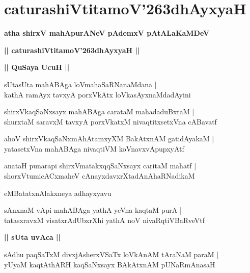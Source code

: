 \documentclass[twoside,12pt,openright]{book}
\def\S{\char'263}
\newcounter{shloka}[chapter]
\def\uvaca#1{\centerline{{\large\textbf{#1}}}}
\begin{document}
\chapter{caturashiVtitamoV\S dhAyxyaH}

\begin{center}
{\LARGE\bfseries atha shirxV mahApurANeV pAdemxV pAtALaKaMDeV }
\end{center}

\begin{center}         
{\LARGE\bfseries || caturashiVtitamoV\S dhAyxyaH ||}
\end{center}

\uvaca{|| QuSaya UcuH ||}

\begin{shloka}%
sUtasUta mahABAga loVmahaSaRNanaMdana |\\
kathA ramAyx tavxyA porxVkAtx loVkasAyxnaMdadAyini
\end{shloka}

\begin{shloka}%
shirxVkaqSaNxsayx mahABAga carataM mahadaduBxtaM |\\
shurxtaM saravxM tavxyA porxVkatxM nivaqtitxsetxVna cABavatf 
\end{shloka}

\begin{shloka}%
ahoV shirxVkaqSaNxmAhAtamxyXM BakAtxnAM gatidAyakaM |\\
yatasetxVna mahABAga nivaqtiVM koVnavxvApupxyAtf 
\end{shloka}

\begin{shloka}%
anataH punarapi shirxVmatakxqqSaNxsayx caritaM mahatf |\\
shorxVtumicACxmaheV cAnayxdavxrXtadAnAhaRNadikaM 
\end{shloka}

\begin{center}
eMBatatxnAlakxneya adhayxyavu
\end{center}

\begin{shloka}%
sAnxnaM vApi mahABAga yathA yeVna kaqtaM purA |\\
tatasxravxM visatxrAdUbxrXhi yathA noV nivaRqtiVBaRveVtf 
\end{shloka}

\uvaca{|| sUta uvAca ||}

\begin{shloka}%
sAdhu paqSaTxM divxjAsherxVSaTx loVkAnAM tAraNaM paraM |\\
yUyaM kaqtAthARH kaqSaNxsayx BAkAtxnAM pUNaRmAnasaH 
\end{shloka}
\end{document}
